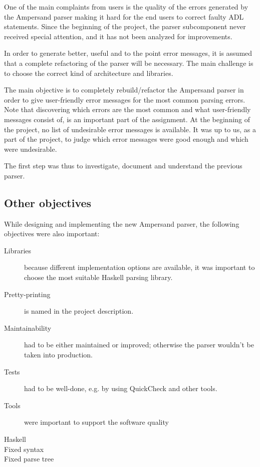 One of the main complaints from users is the quality of the errors generated by the Ampersand parser making it hard for the end users to correct faulty ADL statements.
Since the beginning of the project, the parser subcomponent never received special attention, and it has not been analyzed for improvements.

In order to generate better, useful and to the point error messages, it is assumed that a complete refactoring of the parser will be necessary.
The main challenge is to choose the correct kind of architecture and libraries.

The main objective is to completely rebuild/refactor the Ampersand parser in order to give user-friendly error messages for the most common parsing errors.
Note that discovering which errors are the most common and what user-friendly messages consist of, is an important part of the assignment.
At the beginning of the project, no list of undesirable error messages is available.
It was up to us, as a part of the project, to judge which error messages were good enough and which were undesirable.

The first step was thus to investigate, document and understand the previous parser.

\subsection{Other objectives}
While designing and implementing the new Ampersand parser, the following objectives were also important:
\begin{description}
  \item [Libraries] because different implementation options are available, it was important to choose the most suitable Haskell parsing library.
  \item [Pretty-printing] is named in the project description.
  \item [Maintainability] had to be either maintained or improved; otherwise the parser wouldn't be taken into production.
  \item [Tests] had to be well-done, e.g. by using QuickCheck and other tools.
  \item [Tools] were important to support the software quality
  \item [Haskell]
  \item [Fixed syntax]
  \item [Fixed parse tree]
\end{description}


